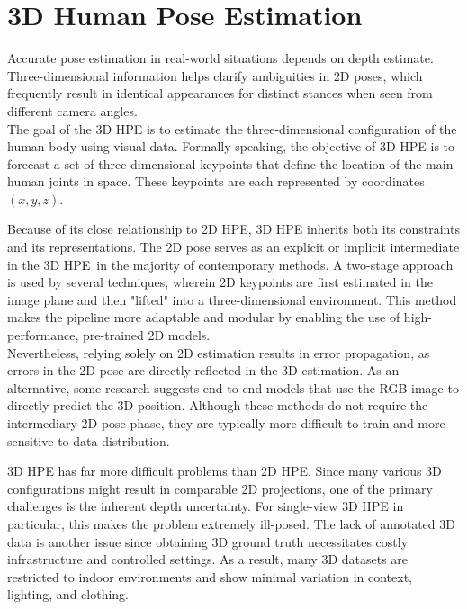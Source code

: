 \section{3D Human Pose Estimation}
Accurate pose estimation in real-world situations depends on depth estimate.
Three-dimensional information helps clarify ambiguities in 2D poses, which frequently result in identical appearances for distinct stances when seen from different camera angles.\\
The goal of the 3D HPE is to estimate the three-dimensional configuration of the human body using visual data.
Formally speaking, the objective of 3D HPE is to forecast a set of three-dimensional keypoints that define the location of the main human joints in space. These keypoints are each represented by coordinates $(x, y, z)$.


Because of its close relationship to 2D HPE, 3D HPE inherits both its constraints and its representations. The 2D pose serves as an explicit or implicit intermediate in the 3D HPE in the majority of contemporary methods. A two-stage 
approach is used by several techniques, wherein 2D keypoints are first estimated in the image plane and then "lifted" into a three-dimensional environment. This method makes the pipeline more adaptable and modular by enabling the use of high-performance, pre-trained 2D models.\\
Nevertheless, relying solely on 2D estimation results in error propagation, as errors in the 2D pose are directly reflected in the 3D estimation.
As an alternative, some research suggests end-to-end models that use the RGB image to directly predict the 3D position. Although these methods do not require the intermediary 2D pose phase, they are typically more difficult to train and more sensitive to data distribution.

3D HPE has far more difficult problems than 2D HPE.
Since many various 3D configurations might result in comparable 2D projections, one of the primary challenges is the inherent depth uncertainty. For single-view 3D HPE in particular, this makes the problem extremely ill-posed.
The lack of annotated 3D data is another issue since obtaining 3D ground truth necessitates costly infrastructure and controlled settings. As a result, many 3D datasets are restricted to indoor environments and show minimal variation in context, lighting, and clothing.

